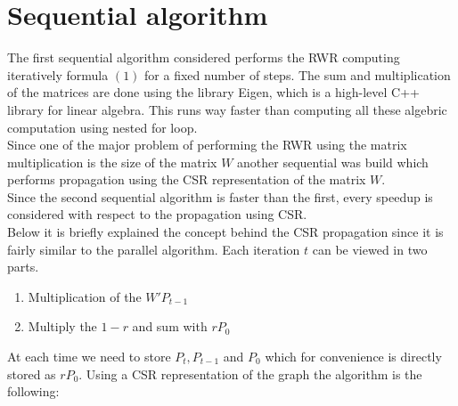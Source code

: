 \documentclass[a4paper]{article}
\begin{document}
\section{Sequential algorithm}

The first sequential algorithm considered performs the RWR computing iteratively
formula $(1)$ for a fixed number of steps. The sum and multiplication of the
matrices are done using the library Eigen, which is a high-level C++ library for linear
algebra. This runs way faster than computing all these algebric computation
using nested for loop.\\
Since one of the major problem of performing the RWR using the matrix multiplication is the
size of the matrix $W$ another sequential was build which performs propagation
using the CSR representation of the matrix $W$.\\
Since the second sequential algorithm is faster than the first, every speedup
is considered with respect to the propagation using CSR.\\
Below it is briefly explained the concept behind the CSR propagation since it is 
fairly similar to the parallel algorithm.
\newpage
Each iteration $t$ can be viewed in two parts.
\begin{enumerate}
    \item Multiplication of the $W'P_{t-1}$
    \item Multiply the $1-r$ and sum with $rP_0$
\end{enumerate}
At each time we need to store $P_t, P_{t-1}$ and $P_0$ which for convenience is
directly stored as $rP_0$.
Using a CSR representation of the graph the algorithm is the following:
\end{document}
